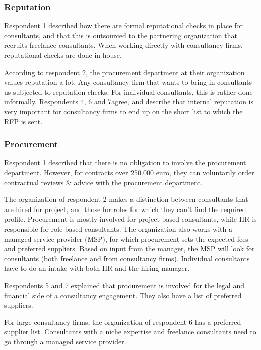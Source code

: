 \documentclass[12pt]{article}
\begin{document}
\subsubsection{Reputation}\label{reputation-1}

Respondent 1 described how there are formal reputational checks in place
for consultants, and that this is outsourced to the partnering
organization that recruits freelance consultants. When working directly
with consultancy firms, reputational checks are done in-house.

According to respondent 2, the procurement department at their
organization values reputation a lot. Any consultancy firm that wants to
bring in consultants us subjected to reputation checks. For individual
consultants, this is rather done informally. Respondents 4, 6 and
7agree, and describe that internal reputation is very important for
consultancy firms to end up on the short list to which the RFP is sent.

\subsubsection{Procurement}\label{procurement-1}

Respondent 1 described that there is no obligation to involve the
procurement department. However, for contracts over 250.000 euro, they
can voluntarily order contractual reviews \& advice with the procurement
department.

The organization of respondent 2 makes a distinction between consultants
that are hired for project, and those for roles for which they can't
find the required profile. Procurement is mostly involved for
project-based consultants, while HR is responsible for role-based
consultants. The organization also works with a managed service provider
(MSP), for which procurement sets the expected fees and preferred
suppliers. Based on input from the manager, the MSP will look for
consultants (both freelance and from consultancy firms). Individual
consultants have to do an intake with both HR and the hiring manager.

Respondents 5 and 7 explained that procurement is involved for the legal
and financial side of a consultancy engagement. They also have a list of
preferred suppliers.

For large consultancy firms, the organization of respondent 6 has a
preferred supplier list. Consultants with a niche expertise and
freelance consultants need to go through a managed service provider.
\end{document}
